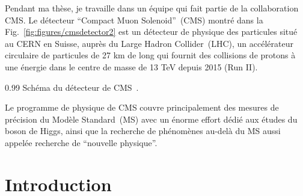 
Pendant ma thèse, je travaille dans un équipe qui fait partie de la collaboration CMS. Le détecteur ``Compact Muon Solenoid''~(CMS) montré dans la Fig.~\ref{fig:figures/cmsdetector2} est un détecteur de physique des particules situé au CERN en Suisse, auprès du Large Hadron Collider~(LHC), un accélérateur circulaire de particules de 27 km de long qui fournit des collisions de protons à une énergie dans le centre de masse de 13 TeV depuis 2015 (Run II).

                 {0.99}       %
                 { Schéma du détecteur de CMS~\cite{website:CMSdet}. }


Le programme de physique de CMS couvre principalement des mesures de précision du Modèle Standard~(MS) avec un énorme effort dédié aux études du boson de Higgs, ainsi que la recherche de phénomènes au-delà du MS aussi appelée recherche de ``nouvelle physique''.

\section{Introduction}



